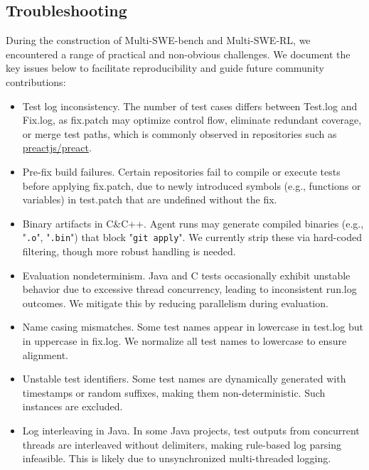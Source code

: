 \documentclass[11pt, a4paper, logo, copyright, nonumbering]{seed}
\newcommand{\multiswebench}{Multi-SWE-bench\xspace}
\newcommand{\multiswerl}{Multi-SWE-RL\xspace}
\begin{document}
\subsection{Troubleshooting}
\label{sec:troubleshooting}
During the construction of \multiswebench and \multiswerl, we encountered a range of practical and non-obvious challenges.
We document the key issues below to facilitate reproducibility and guide future community contributions:
\begin{itemize}[leftmargin=*]
    \item Test log inconsistency. The number of test cases differs between Test.log and Fix.log, as fix.patch may optimize control flow, eliminate redundant coverage, or merge test paths, which is commonly observed in repositories such as \href{https://github.com/preactjs/preact}{preactjs/preact}.
    \item Pre-fix build failures. Certain repositories fail to compile or execute tests before applying fix.patch, due to newly introduced symbols (e.g., functions or variables) in test.patch that are undefined without the fix.
    \item Binary artifacts in C\&C++. Agent runs may generate compiled binaries (e.g., "\texttt{.o}", "\texttt{.bin}") that block "\texttt{git apply}". We currently strip these via hard-coded filtering, though more robust handling is needed.
    \item Evaluation nondeterminism. Java and C tests occasionally exhibit unstable behavior due to excessive thread concurrency, leading to inconsistent run.log outcomes. We mitigate this by reducing parallelism during evaluation.
    \item Name casing mismatches. Some test names appear in lowercase in test.log but in uppercase in fix.log. We normalize all test names to lowercase to ensure alignment.
    \item Unstable test identifiers. Some test names are dynamically generated with timestamps or random suffixes, making them non-deterministic. Such instances are excluded.
    \item Log interleaving in Java. In some Java projects, test outputs from concurrent threads are interleaved without delimiters, making rule-based log parsing infeasible. This is likely due to unsynchronized multi-threaded logging.
\end{itemize}
\end{document}
